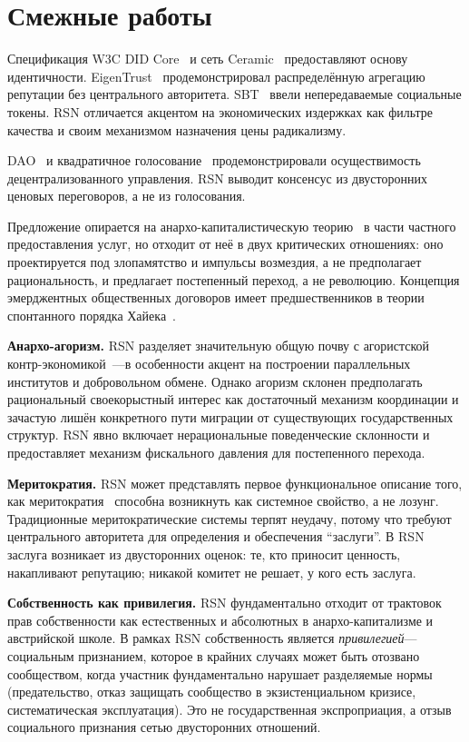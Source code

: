 \documentclass[11pt,a4paper,twocolumn]{article}
\begin{document}
\section{Смежные работы}

Спецификация W3C DID Core~\cite{did2022} и сеть Ceramic~\cite{ceramic2023} предоставляют основу идентичности. EigenTrust~\cite{kamvar2003} продемонстрировал распределённую агрегацию репутации без центрального авторитета. SBT~\cite{weyl2022} ввели непередаваемые социальные токены. RSN отличается акцентом на экономических издержках как фильтре качества и своим механизмом назначения цены радикализму.

DAO~\cite{buterin2014} и квадратичное голосование~\cite{buterin2019} продемонстрировали осуществимость децентрализованного управления. RSN выводит консенсус из двусторонних ценовых переговоров, а не из голосования.

Предложение опирается на анархо-капиталистическую теорию~\cite{rothbard1973,hoppe2001} в части частного предоставления услуг, но отходит от неё в двух критических отношениях: оно проектируется под злопамятство и импульсы возмездия, а не предполагает рациональность, и предлагает постепенный переход, а не революцию. Концепция эмерджентных общественных договоров имеет предшественников в теории спонтанного порядка Хайека~\cite{hayek1973}.

\textbf{Анархо-агоризм.} RSN разделяет значительную общую почву с агористской контр-экономикой~\cite{konkin2006}---в особенности акцент на построении параллельных институтов и добровольном обмене. Однако агоризм склонен предполагать рациональный своекорыстный интерес как достаточный механизм координации и зачастую лишён конкретного пути миграции от существующих государственных структур. RSN явно включает нерациональные поведенческие склонности и предоставляет механизм фискального давления для постепенного перехода.

\textbf{Меритократия.} RSN может представлять первое функциональное описание того, как меритократия~\cite{young1958} способна возникнуть как системное свойство, а не лозунг. Традиционные меритократические системы терпят неудачу, потому что требуют центрального авторитета для определения и обеспечения ``заслуги''. В RSN заслуга возникает из двусторонних оценок: те, кто приносит ценность, накапливают репутацию; никакой комитет не решает, у кого есть заслуга.

\textbf{Собственность как привилегия.} RSN фундаментально отходит от трактовок прав собственности как естественных и абсолютных в анархо-капитализме и австрийской школе. В рамках RSN собственность является \emph{привилегией}---социальным признанием, которое в крайних случаях может быть отозвано сообществом, когда участник фундаментально нарушает разделяемые нормы (предательство, отказ защищать сообщество в экзистенциальном кризисе, систематическая эксплуатация). Это не государственная экспроприация, а отзыв социального признания сетью двусторонних отношений.
\end{document}
